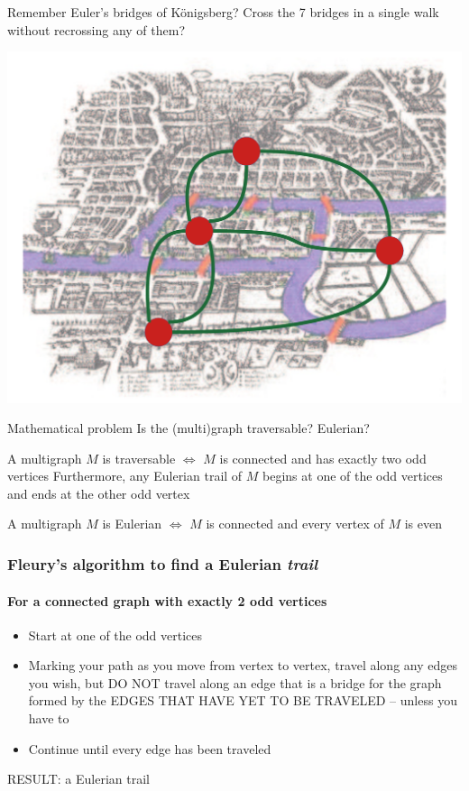 \documentclass[aspectratio=169]{beamer}\usepackage[]{graphicx}\usepackage[]{xcolor}
\begin{document}
\begin{frame}{Remember Euler's bridges of K\"onigsberg?}
	Cross the 7 bridges in a single walk without recrossing any of them?
	\begin{center}
	\includegraphics[width=.7\textwidth]{FIGS_slides/bridge_color_with_graph}
	\end{center}
	\begin{block}{Mathematical problem}
		Is the (multi)graph traversable? Eulerian?
	\end{block}
	\end{frame}


\begin{frame}
\begin{theorem}
	A multigraph $M$ is traversable $\iff$ $M$ is connected and has exactly two odd vertices
	\vskip0.2cm
	Furthermore, any Eulerian trail of $M$ begins at one of the odd vertices and ends at the other odd vertex
\end{theorem}
\vfill
\begin{theorem}
	A multigraph $M$ is Eulerian $\iff$ $M$ is connected and every vertex of $M$ is even
\end{theorem}
\end{frame}




\begin{frame}
	\frametitle{Fleury's algorithm to find a Eulerian \emph{trail}}
	\framesubtitle{For a connected graph with exactly 2 odd vertices}
\begin{itemize}
	\item Start at one of the odd vertices
	\item Marking your path as you move from vertex to vertex, travel along any edges you wish, but DO NOT travel along an edge that is a bridge for the graph formed by the EDGES THAT HAVE YET TO BE TRAVELED -- unless you have to
	\item Continue until every edge has been traveled
\end{itemize}
RESULT: a Eulerian trail
\end{frame}
\end{document}
